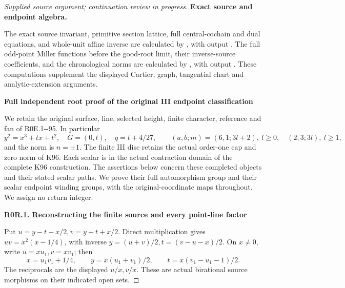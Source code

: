 \begin{proof}[Supplied source argument; continuation review in progress]
\par\medskip\noindent\textbf{Exact source and endpoint algebra.}\par
The exact source invariant, primitive section lattice, full central-cochain
and dual equations, and whole-unit affine inverse are calculated by
, with output .
The full odd-point Miller functions before the good-root limit, their
inverse-source coefficients, and the chronological norms are calculated
by , with output .
These computations supplement the displayed Cartier, graph, tangential
chart and analytic-extension arguments.


\par\bigskip\noindent\textbf{Full independent root proof of the original III endpoint classification}\par\nobreak

We retain the original surface, line, selected height, finite character,
reference and fan of R0E.1-\/-95. In particular
\[
 y^2=x^3+tx+t^2,\quad G=(0,t),\quad q=t+4/27,
 \qquad (a,b;m)=(6,1;3l+2),\ l\ge0,
 \quad (2,3;3l),\ l\ge1,
 \tag{R0R.1}
\]
and the norm is \(n=\pm1\). The finite III disc retains the actual
order-one cap and zero norm of K96. Each scalar is in the actual contraction
domain of the complete K96 construction. The assertions below concern
these completed objects and their stated scalar paths. We prove their
full automorphism group and their scalar endpoint winding groups, with
the original-coordinate maps throughout. We assign no return integer.

\par

\medskip\noindent\textbf{R0R.1. Reconstructing the finite source and every point-line factor}

\par\nobreak

Put \(u=y-t-x/2,v=y+t+x/2\). Direct multiplication gives
\(uv=x^2(x-1/4)\), with inverse
\(y=(u+v)/2,t=(v-u-x)/2\). On \(x\ne0\), write
\(u=xu_1,v=xv_1\); then
\[
 x=u_1v_1+1/4,\qquad y=x(u_1+v_1)/2,
 \qquad t=x(v_1-u_1-1)/2.                       \tag{R0R.2}
\]
The reciprocals are the displayed \(u/x,v/x\). These are actual
birational source morphisms on their indicated open sets.


\end{proof}
